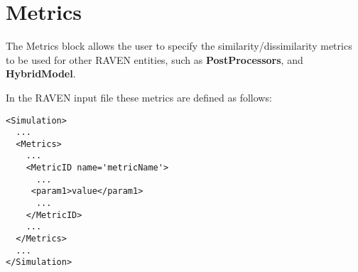
\section{Metrics}
\label{sec:Metrics}

\newcommand{\metrictypeI}[3]
{
  This metric interface directly with the metric available within \textit{#1}.
  The specifications of this metric must be defined within the XML block \xmlNode{#2}.
  This XML node needs to contain the following subnode:

  \begin{itemize}
    \item \xmlNode{metricType}\texttt{#3}\xmlNode{/metricType}, \xmlDesc{vertical bar (\texttt{|}) separated
      string, required field}.
  \end{itemize}

}
\newcommand{\metrictypeII}[3]
{
  \metrictypeI{#1}{#2}{#3}

  In addition to this XML subnode, the users can also specify the weights for given metric:
  \begin{itemize}
    \item \xmlNode{w}, \xmlDesc{python list, optional parameter}, the weights for each value in \textit{u}
      and \textit{v}. Default is None, which gives each value a weight of 1.0.
  \end{itemize}
}

\newcommand{\metrictypeIII}[3]
{
  \metrictypeI{#1}{#2}{#3}

  In addition to this XML subnode, the users can also specify the weights for given metric:
  \begin{itemize}
    \item \xmlNode{sample\_weight}, \xmlDesc{python list, optional parameter}, the weights for each value in \textit{u}
      and \textit{v}. Default is None, which gives each value a weight of 1.0.
  \end{itemize}
}

The Metrics block allows the user to specify the similarity/dissimilarity metrics to be used for other
RAVEN entities, such as \textbf{PostProcessors}, and \textbf{HybridModel}.

In the RAVEN input file these metrics are defined as follows:
\begin{lstlisting}[style=XML]
<Simulation>
  ...
  <Metrics>
    ...
    <MetricID name='metricName'>
      ...
     <param1>value</param1>
      ...
    </MetricID>
    ...
  </Metrics>
  ...
</Simulation>
\end{lstlisting}

